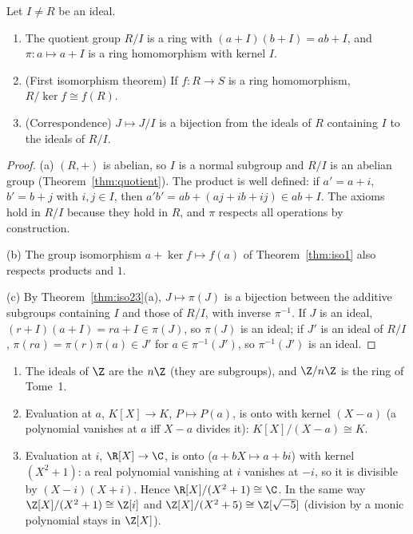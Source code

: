 \begin{proposition}\label{prop:quotring}
Let $I\ne R$ be an ideal.
\begin{enumerate}[label=(\alph*)]
\item The quotient group $R/I$ is a ring with $(a+I)(b+I)=ab+I$, and $\pi:a\mapsto a+I$ is a ring homomorphism with kernel $I$.
\item (First isomorphism theorem) If $f:R\to S$ is a ring homomorphism, $R/\ker f\cong f(R)$.
\item (Correspondence) $J\mapsto J/I$ is a bijection from the ideals of $R$ containing $I$ to the ideals of $R/I$.
\end{enumerate}
\end{proposition}
\begin{proof}
(a) $(R,+)$ is abelian, so $I$ is a normal subgroup and $R/I$ is an abelian group (Theorem~\ref{thm:quotient}). The product is well defined: if $a'=a+i$, $b'=b+j$ with $i,j\in I$, then $a'b'=ab+(aj+ib+ij)\in ab+I$. The axioms hold in $R/I$ because they hold in $R$, and $\pi$ respects all operations by construction.

(b) The group isomorphism $a+\ker f\mapsto f(a)$ of Theorem~\ref{thm:iso1} also respects products and $1$.

(c) By Theorem~\ref{thm:iso23}(a), $J\mapsto\pi(J)$ is a bijection between the additive subgroups containing $I$ and those of $R/I$, with inverse $\pi^{-1}$. If $J$ is an ideal, $(r+I)(a+I)=ra+I\in\pi(J)$, so $\pi(J)$ is an ideal; if $J'$ is an ideal of $R/I$, $\pi(ra)=\pi(r)\pi(a)\in J'$ for $a\in\pi^{-1}(J')$, so $\pi^{-1}(J')$ is an ideal.
\end{proof}

\begin{example}\label{ex:quotients}
\begin{enumerate}[label=(\arabic*)]
\item The ideals of $\Z$ are the $n\Z$ (they are subgroups), and $\Z/n\Z$ is the ring of Tome~1.
\item Evaluation at $a$, $K[X]\to K$, $P\mapsto P(a)$, is onto with kernel $(X-a)$ (a polynomial vanishes at $a$ iff $X-a$ divides it): $K[X]/(X-a)\cong K$.
\item Evaluation at $i$, $\R[X]\to\C$, is onto ($a+bX\mapsto a+bi$) with kernel $(X^2+1)$: a real polynomial vanishing at $i$ vanishes at $-i$, so it is divisible by $(X-i)(X+i)$. Hence $\R[X]/(X^2+1)\cong\C$. In the same way $\Z[X]/(X^2+1)\cong\Z[i]$ and $\Z[X]/(X^2+5)\cong\Z[\sqrt{-5}]$ (division by a monic polynomial stays in $\Z[X]$).
\end{enumerate}
\end{example}

